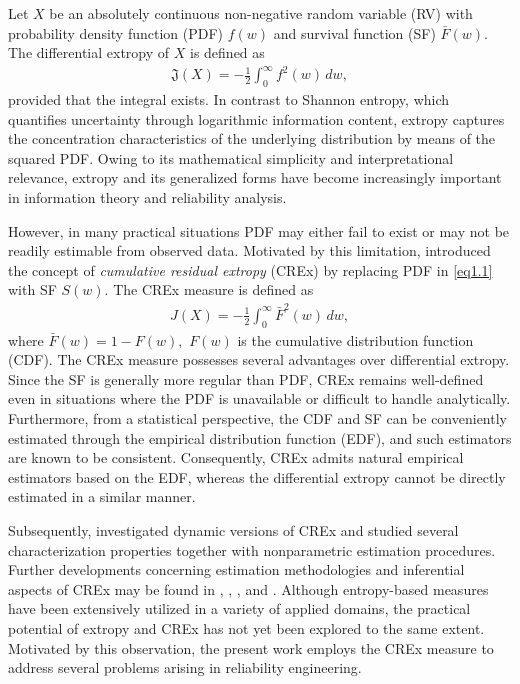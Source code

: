 \documentclass[12pt,a4paper]{article}
\numberwithin{equation}{section}
\begin{document}
Let $X$ be an absolutely continuous non-negative random variable (RV) with probability density function (PDF) $f(w)$ and survival function (SF) $\bar F(w)$. The differential extropy of $X$ is defined as
\begin{align}\label{eq1.1}
    \mathfrak{J}(X)
    =
    -\frac{1}{2}\int_{0}^{\infty} f^{2}(w)\,dw,
\end{align}
provided that the integral exists. In contrast to Shannon entropy, which quantifies uncertainty through logarithmic information content, extropy captures the concentration characteristics of the underlying distribution by means of the squared PDF. Owing to its mathematical simplicity and interpretational relevance, extropy and its generalized forms have become increasingly important in information theory and reliability analysis.

However, in many practical situations PDF may either fail to exist or may not be readily estimable from observed data. Motivated by this limitation, \cite{jahan2019} introduced the concept of \emph{cumulative residual extropy} (CREx) by replacing PDF in \eqref{eq1.1} with SF $S(w)$. The CREx measure is defined as
\begin{align}\label{eq1.2}
    J(X)
    =
    -\frac{1}{2}\int_{0}^{\infty} \bar F^{2}(w)\,dw,
\end{align}
where $\bar F(w)=1-F(w),$ $F(w)$ is the cumulative distribution function (CDF).
The CREx measure possesses several advantages over differential extropy. Since the SF is generally more regular than PDF, CREx remains well-defined even in situations where the PDF is unavailable or difficult to handle analytically. Furthermore, from a statistical perspective, the CDF and  SF can be conveniently estimated through the empirical distribution function (EDF), and such estimators are known to be consistent. Consequently, CREx admits natural empirical estimators based on the EDF, whereas the differential extropy cannot be directly estimated in a similar manner.

Subsequently, \cite{sathar2021} investigated dynamic versions of CREx and studied several characterization properties together with nonparametric estimation procedures. Further developments concerning estimation methodologies and inferential aspects of CREx may be found in \cite{kaz2021}, \cite{kattu2022}, \cite{pakda2025}, and \cite{chak2025}. Although entropy-based measures have been extensively utilized in a variety of applied domains, the practical potential of extropy and CREx has not yet been explored to the same extent. Motivated by this observation, the present work employs the CREx measure to address several problems arising in reliability engineering.
\end{document}
